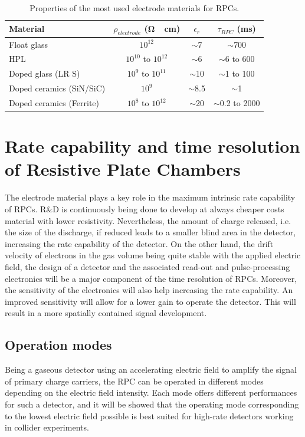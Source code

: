 	\begin{table}[H]
		\centering
		\begin{tabular}{|l|c|c|c|}
		\hline
		Material & $\rho_{electrode}$ (\si{\ohm\cdot cm}) & $\epsilon_r$ & $\tau_{RPC}$ (\si{ms})\\
		\hline
		Float glass & $10^{12}$ & $\sim$7 & $\sim$700\\
		\acl{HPL} & $10^{10}$ to $10^{12}$ & $\sim$6 & $\sim$6 to 600\\
		Doped glass (LR S) & $10^{9}$ to $10^{11}$ & $\sim$10 & $\sim$1 to 100\\
		Doped ceramics (SiN/SiC) & $10^{9}$ & $\sim$8.5 & $\sim$1\\
		Doped ceramics (Ferrite) & $10^{8}$ to $10^{12}$ & $\sim$20 & $\sim$0.2 to 2000\\
		\hline
		\end{tabular}
		\caption{\label{tab:tau} Properties of the most used electrode materials for RPCs.}
	\end{table}

\section{Rate capability and time resolution of Resistive Plate Chambers}
\label{chapt3:sec:RateCapa}

	The electrode material plays a key role in the maximum intrinsic rate capability of RPCs. R\&D is continuously being done to develop at always cheaper costs material with lower resistivity. Nevertheless, the amount of charge released, i.e. the size of the discharge, if reduced leads to a smaller blind area in the detector, increasing the rate capability of the detector. On the other hand, the drift velocity of electrons in the gas volume being quite stable with the applied electric field, the design of a detector and the associated read-out and pulse-processing electronics will be a major component of the time resolution of RPCs. Moreover, the sensitivity of the electronics will also help increasing the rate capability. An improved sensitivity will allow for a lower gain to operate the detector. This will result in a more spatially contained signal development.
	
	\subsection{Operation modes}
	\label{chapt3:ssec:operation}
	
	Being a gaseous detector using an accelerating electric field to amplify the signal of primary charge carriers, the RPC can be operated in different modes depending on the electric field intensity. Each mode offers different performances for such a detector, and it will be showed that the operating mode corresponding to the lowest electric field possible is best suited for high-rate detectors working in collider experiments.
	
